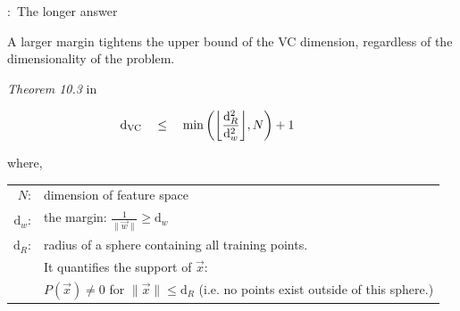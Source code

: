 \begin{frame}{\subsecname:~The longer answer}


A larger margin tightens the upper bound of the VC dimension, regardless of the dimensionality of the problem. 

\begin{block}{\textit{Theorem 10.3} in \citep{Vapnik1998}}

\begin{equation}
    \mathrm{d}_{\mathrm{VC}} \quad\leq\quad \min \bigg( \bigg\lfloor 
    \frac{\mathrm{d}_R^2}{\mathrm{d}_{{w}}^2}
\bigg\rfloor, N \bigg) + 1\qquad\qquad
\label{eq:dvcmarginbound}
\end{equation}

where,\\

\begin{tabular}{rl}
    $N$\;:& dimension of feature space \\[1mm]
    $\mathrm{d}_w$\;:& the margin: 
        $\frac{1}{\|\vec w \|} \geq \mathrm{d}_w$ \\[1mm]
    $\mathrm{d}_R$\;:& radius of a sphere containing all training points.\\
    &It quantifies the support of $\vec x$:\\
    & $P(\vec x) \neq 0$ for $\|\vec x\| \leq \mathrm{d}_R$ (i.e. no points exist outside of this sphere.)
\end{tabular}
\end{block}


\end{frame}
